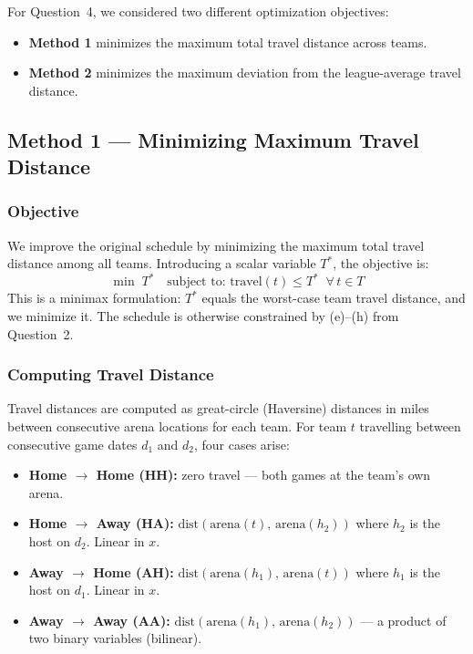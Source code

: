 \documentclass[11pt, letterpaper]{article}
\begin{document}
For Question~4, we considered two different optimization objectives:

\begin{itemize}[nosep]
  \item \textbf{Method 1} minimizes the maximum total travel distance across teams.
  \item \textbf{Method 2} minimizes the maximum deviation from the league-average travel distance.
\end{itemize}

\subsection{Method 1 --- Minimizing Maximum Travel Distance}

\subsubsection*{Objective}

We improve the original schedule by minimizing the maximum total travel distance
among all teams. Introducing a scalar variable $T^*$, the objective is:
\[
  \min\; T^* \quad \text{subject to: } \mathrm{travel}(t) \leq T^* \;\; \forall\, t \in T
\]
This is a minimax formulation: $T^*$ equals the worst-case team travel distance,
and we minimize it. The schedule is otherwise constrained by (e)--(h) from
Question~2.

\subsubsection*{Computing Travel Distance}

Travel distances are computed as great-circle (Haversine) distances in miles
between consecutive arena locations for each team. For team $t$ travelling
between consecutive game dates $d_1$ and $d_2$, four cases arise:

\begin{itemize}[nosep]
  \item \textbf{Home $\to$ Home (HH):} zero travel --- both games at the team's own arena.
  \item \textbf{Home $\to$ Away (HA):} $\mathrm{dist}(\mathrm{arena}(t),\,\mathrm{arena}(h_2))$ where $h_2$ is the host on $d_2$. Linear in $x$.
  \item \textbf{Away $\to$ Home (AH):} $\mathrm{dist}(\mathrm{arena}(h_1),\,\mathrm{arena}(t))$ where $h_1$ is the host on $d_1$. Linear in $x$.
  \item \textbf{Away $\to$ Away (AA):} $\mathrm{dist}(\mathrm{arena}(h_1),\,\mathrm{arena}(h_2))$ --- a product of two binary variables (bilinear).
\end{itemize}
\end{document}
